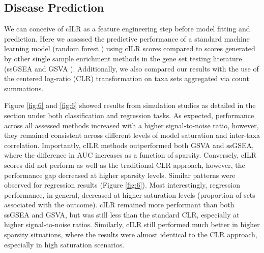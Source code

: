 \documentclass{article}
\begin{document}
\subsection*{Disease Prediction} 
We can conceive of cILR as a feature engineering step before model fitting and prediction. Here we assessed the predictive performance of a standard machine learning model (random forest \cite{breiman2001}) using cILR scores compared to scores generated by other single sample enrichment methods in the gene set testing literature (ssGSEA \cite{barbie2009} and GSVA \cite{hanzelmann2013}). Additionally, we also compared our results with the use of the centered log-ratio (CLR) transformation on taxa sets aggregated via count summations.    

Figure \ref{fig:6} and \ref{fig:6} showed results from simulation studies as detailed in the  section under both classification and regression tasks. As expected, performance across all assessed methods increased with a higher signal-to-noise ratio, however, they remained consistent across different levels of model saturation and inter-taxa correlation. Importantly, cILR methods outperformed both GSVA and ssGSEA, where the difference in AUC increases as a function of sparsity. Conversely, cILR scores did not perform as well as the traditional CLR approach, however, the performance gap decreased at higher sparsity levels. Similar patterns were observed for regression results (Figure \ref{fig:6}). Most interestingly, regression performance, in general, decreased at higher saturation levels (proportion of sets associated with the outcome). cILR remained more performant than both ssGSEA and GSVA, but was still less than the standard CLR, especially at higher signal-to-noise ratios. Similarly, cILR still performed much better in higher sparsity situations, where the results were almost identical to the CLR approach, especially in high saturation scenarios.     
\end{document}
